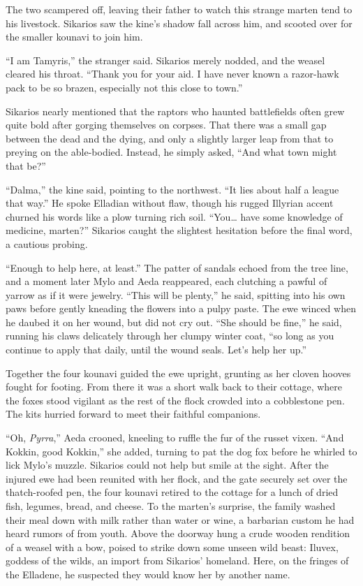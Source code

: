 The two scampered off, leaving their father to watch this strange marten tend to his livestock. Sikarios saw the kine's shadow fall across him, and scooted over for the smaller kounavi to join him.

``I am Tamyris,'' the stranger said. Sikarios merely nodded, and the weasel cleared his throat. ``Thank you for your aid. I have never known a razor-hawk pack to be so brazen, especially not this close to town.''

Sikarios nearly mentioned that the raptors who haunted battlefields often grew quite bold after gorging themselves on corpses. That there was a small gap between the dead and the dying, and only a slightly larger leap from that to preying on the able-bodied. Instead, he simply asked, ``And what town might that be?''

``Dalma,'' the kine said, pointing to the northwest. ``It lies about half a league that way.'' He spoke Elladian without flaw, though his rugged Illyrian accent churned his words like a plow turning rich soil. ``You\ldots{} have some knowledge of medicine, marten?'' Sikarios caught the slightest hesitation before the final word, a cautious probing.

``Enough to help here, at least.'' The patter of sandals echoed from the tree line, and a moment later Mylo and Aeda reappeared, each clutching a pawful of yarrow as if it were jewelry. ``This will be plenty,'' he said, spitting into his own paws before gently kneading the flowers into a pulpy paste. The ewe winced when he daubed it on her wound, but did not cry out. ``She should be fine,'' he said, running his claws delicately through her clumpy winter coat, ``so long as you continue to apply that daily, until the wound seals. Let's help her up.''

Together the four kounavi guided the ewe upright, grunting as her cloven hooves fought for footing. From there it was a short walk back to their cottage, where the foxes stood vigilant as the rest of the flock crowded into a cobblestone pen. The kits hurried forward to meet their faithful companions.

``Oh, \emph{Pyrra},'' Aeda crooned, kneeling to ruffle the fur of the russet vixen. ``And Kokkin, good Kokkin,'' she added, turning to pat the dog fox before he whirled to lick Mylo's muzzle. Sikarios could not help but smile at the sight. After the injured ewe had been reunited with her flock, and the gate securely set over the thatch-roofed pen, the four kounavi retired to the cottage for a lunch of dried fish, legumes, bread, and cheese. To the marten's surprise, the family washed their meal down with milk rather than water or wine, a barbarian custom he had heard rumors of from youth. Above the doorway hung a crude wooden rendition of a weasel with a bow, poised to strike down some unseen wild beast: Iluvex, goddess of the wilds, an import from Sikarios' homeland. Here, on the fringes of the Elladene, he suspected they would know her by another name.

